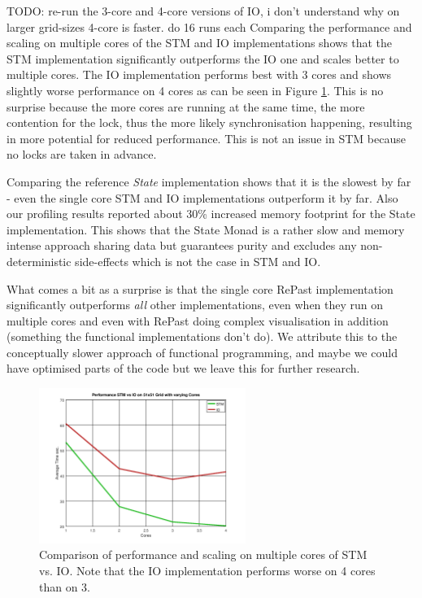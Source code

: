 TODO: re-run the 3-core and 4-core versions of IO, i don't understand why on larger grid-sizes 4-core is faster. do 16 runs each
Comparing the performance and scaling on multiple cores of the STM and IO implementations shows that the STM implementation significantly outperforms the IO one and scales better to multiple cores. The IO implementation performs best with 3 cores and shows slightly worse performance on 4 cores as can be seen in Figure \ref{fig:core_duration_stm_io}. This is no surprise because the more cores are running at the same time, the more contention for the lock, thus the more likely synchronisation happening, resulting in more potential for reduced performance. This is not an issue in STM because no locks are taken in advance. 

Comparing the reference \textit{State} implementation shows that it is the slowest by far - even the single core STM and IO implementations outperform it by far. Also our profiling results reported about 30\% increased memory footprint for the State implementation. This shows that the State Monad is a rather slow and memory intense approach sharing data but guarantees purity and excludes any non-deterministic side-effects which is not the case in STM and IO.

What comes a bit as a surprise is that the single core RePast implementation significantly outperforms \textit{all} other implementations, even when they run on multiple cores and even with RePast doing complex visualisation in addition (something the functional implementations don't do). We attribute this to the conceptually slower approach of functional programming, and maybe we could have optimised parts of the code but we leave this for further research.

\begin{figure}
	\centering
	\includegraphics[width=0.6\textwidth, angle=0]{./fig/sir/core_duration_stm_io.png}
	\caption{Comparison of performance and scaling on multiple cores of STM vs. IO. Note that the IO implementation performs worse on 4 cores than on 3.}
	\label{fig:core_duration_stm_io}
\end{figure}

